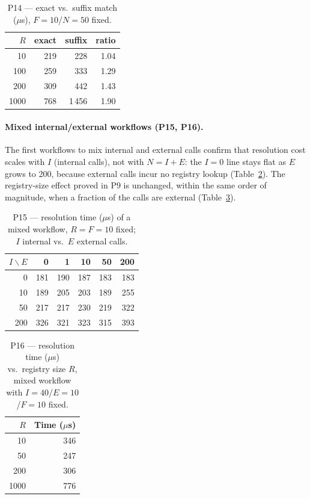 \begin{table}[htbp]
  \centering
  \caption{P14 --- exact vs.\ suffix match ($\mu$s), $F{=}10$/$N{=}50$ fixed.}
  \label{tab:eval-p14}
  \begin{tabular}{rrrr}
    \hline
    \textbf{$R$} & \textbf{exact} & \textbf{suffix} & \textbf{ratio} \\
    \hline
    10   & 219 & 228   & 1.04 \\
    100  & 259 & 333   & 1.29 \\
    200  & 309 & 442   & 1.43 \\
    1000 & 768 & 1\,456 & 1.90 \\
    \hline
  \end{tabular}
\end{table}

\paragraph{Mixed internal/external workflows (P15, P16).}
The first workflows to mix internal and external calls confirm that resolution cost scales with
$I$ (internal calls), not with $N{=}I{+}E$: the $I{=}0$ line stays flat as $E$ grows to 200,
because external calls incur no registry lookup (Table~\ref{tab:eval-p15}). The registry-size
effect proved in P9 is unchanged, within the same order of magnitude, when a fraction of the
calls are external (Table~\ref{tab:eval-p16}).

\begin{table}[htbp]
  \centering
  \caption{P15 --- resolution time ($\mu$s) of a mixed workflow, $R{=}F{=}10$ fixed;
  $I$ internal vs.\ $E$ external calls.}
  \label{tab:eval-p15}
  \begin{tabular}{rrrrrr}
    \hline
    $I\backslash E$ & 0 & 1 & 10 & 50 & 200 \\
    \hline
    0   & 181 & 190 & 187 & 183 & 183 \\
    10  & 189 & 205 & 203 & 189 & 255 \\
    50  & 217 & 217 & 230 & 219 & 322 \\
    200 & 326 & 321 & 323 & 315 & 393 \\
    \hline
  \end{tabular}
\end{table}

\begin{table}[htbp]
  \centering
  \caption{P16 --- resolution time ($\mu$s) vs.\ registry size $R$, mixed workflow with
  $I{=}40$/$E{=}10$/$F{=}10$ fixed.}
  \label{tab:eval-p16}
  \begin{tabular}{rr}
    \hline
    \textbf{$R$} & \textbf{Time ($\mu$s)} \\
    \hline
    10   & 346 \\
    50   & 247 \\
    200  & 306 \\
    1000 & 776 \\
    \hline
  \end{tabular}
\end{table}


